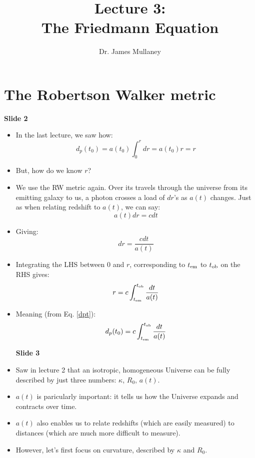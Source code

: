 \documentclass[11pt]{article}
\begin{document}
 
\title{Lecture 3:\\The Friedmann Equation}
\author{Dr. James Mullaney}
\maketitle

\section{The Robertson Walker metric}
{\bf Slide 2}
\begin{itemize}
\item In the last lecture, we saw how:
\begin{equation}
    \label{dpt}
    d_p(t_0) = a(t_0)\int_0^r dr = a(t_0)r = r
\end{equation}
\item But, how do we know $r$?
\item We use the RW metric again. Over its travels through the universe from its emitting galaxy to us, a photon crosses a load of $dr$'s as $a(t)$ changes. Just as when relating redshift to $a(t)$, we can say:
\begin{equation}
    a(t)dr = cdt
\end{equation}
\item Giving:
\begin{equation}
    dr = \frac{cdt}{a(t)}
\end{equation}
\item Integrating the LHS between $0$ and $r$, corresponding to $t_{\rm em}$ to $t_{\rm ob}$ on the RHS gives:
\begin{equation}
    r = c\int_{t_{\rm em}}^{t_{\rm ob}}\frac{dt}{a(t)}
\end{equation}
\item Meaning (from Eq. \ref{dpt}):
\begin{equation}
    d_p(t_0) = c\int_{t_{\rm em}}^{t_{\rm ob}}\frac{dt}{a(t)}
\end{equation}

{\bf Slide 3}
\item Saw in lecture 2 that an isotropic, homogeneous Universe can be fully described by just three numbers: $\kappa$, $R_0$, $a(t)$.
\item $a(t)$ is paricularly important: it tells us how the Universe expands and contracts over time.
\item $a(t)$ also enables us to relate redshifts (which are easily measured) to distances (which are much more difficult to measure).
\item However, let's first focus on curvature, described by $\kappa$ and $R_0$.
\end{itemize}
\end{document}
